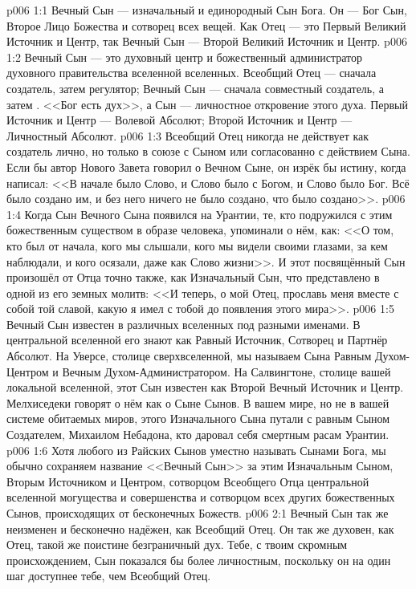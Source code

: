 \vs p006 1:1 Вечный Сын --- изначальный и единородный Сын Бога. Он --- Бог Сын, Второе Лицо Божества и сотворец всех вещей. Как Отец --- это Первый Великий Источник и Центр, так Вечный Сын --- Второй Великий Источник и Центр.
\vs p006 1:2 Вечный Сын --- это духовный центр и божественный администратор духовного правительства вселенной вселенных. Всеобщий Отец --- сначала создатель, затем регулятор; Вечный Сын --- сначала совместный создатель, а затем . <<Бог есть дух>>, а Сын --- личностное откровение этого духа. Первый Источник и Центр --- Волевой Абсолют; Второй Источник и Центр --- Личностный Абсолют.
\vs p006 1:3 Всеобщий Отец никогда не действует как создатель лично, но только в союзе с Сыном или согласованно с действием Сына. Если бы автор Нового Завета говорил о Вечном Сыне, он изрёк бы истину, когда написал: <<В начале было Слово, и Слово было с Богом, и Слово было Бог. Всё было создано им, и без него ничего не было создано, что было создано>>.
\vs p006 1:4 Когда Сын Вечного Сына появился на Урантии, те, кто подружился с этим божественным существом в образе человека, упоминали о нём, как: <<О том, кто был от начала, кого мы слышали, кого мы видели своими глазами, за кем наблюдали, и кого осязали, даже как Слово жизни>>. И этот посвящённый Сын произошёл от Отца точно также, как Изначальный Сын, что представлено в одной из его земных молитв: <<И теперь, о мой Отец, прославь меня вместе с собой той славой, какую я имел с тобой до появления этого мира>>.
\vs p006 1:5 \pc Вечный Сын известен в различных вселенных под разными именами. В центральной вселенной его знают как Равный Источник, Сотворец и Партнёр Абсолют. На Уверсе, столице сверхвселенной, мы называем Сына Равным Духом\hyp{}Центром и Вечным Духом\hyp{}Администратором. На Салвингтоне, столице вашей локальной вселенной, этот Сын известен как Второй Вечный Источник и Центр. Мелхиседеки говорят о нём как о Сыне Сынов. В вашем мире, но не в вашей системе обитаемых миров, этого Изначального Сына путали с равным Сыном Создателем, Михаилом Небадона, кто даровал себя смертным расам Урантии.
\vs p006 1:6 Хотя любого из Райских Сынов уместно называть Сынами Бога, мы обычно сохраняем название <<Вечный Сын>> за этим Изначальным Сыном, Вторым Источником и Центром, сотворцом Всеобщего Отца центральной вселенной могущества и совершенства и сотворцом всех других божественных Сынов, происходящих от бесконечных Божеств.
\vs p006 2:1 Вечный Сын так же неизменен и бесконечно надёжен, как Всеобщий Отец. Он так же духовен, как Отец, такой же поистине безграничный дух. Тебе, с твоим скромным происхождением, Сын показался бы более личностным, поскольку он на один шаг доступнее тебе, чем Всеобщий Отец.
